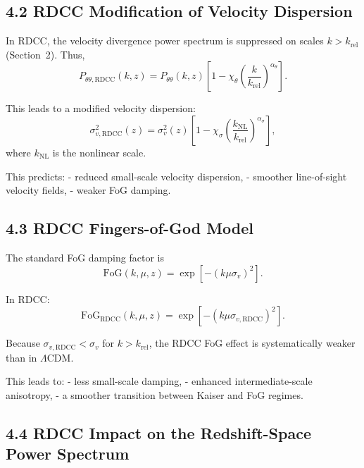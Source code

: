 \documentclass[11pt,a4paper]{article}
\begin{document}
\subsection{4.2 RDCC Modification of Velocity Dispersion}

In RDCC, the velocity divergence power spectrum is suppressed on scales
$k > k_{\mathrm{rel}}$ (Section~2). Thus,
\begin{equation}
P_{\theta\theta,\mathrm{RDCC}}(k,z)
=
P_{\theta\theta}(k,z)
\left[
1
-
\chi_{\theta}
\left(
\frac{k}{k_{\mathrm{rel}}}
\right)^{\alpha_{\theta}}
\right].
\end{equation}

This leads to a modified velocity dispersion:
\begin{equation}
\sigma_{v,\mathrm{RDCC}}^{2}(z)
=
\sigma_{v}^{2}(z)
\left[
1
-
\chi_{\sigma}
\left(
\frac{k_{\mathrm{NL}}}{k_{\mathrm{rel}}}
\right)^{\alpha_{\sigma}}
\right],
\end{equation}
where $k_{\mathrm{NL}}$ is the nonlinear scale.

This predicts:
- reduced small-scale velocity dispersion,  
- smoother line-of-sight velocity fields,  
- weaker FoG damping.

\subsection{4.3 RDCC Fingers-of-God Model}

The standard FoG damping factor is
\begin{equation}
\mathrm{FoG}(k,\mu,z)
=
\exp\!\left[
- (k\mu\sigma_{v})^{2}
\right].
\end{equation}

In RDCC:
\begin{equation}
\mathrm{FoG}_{\mathrm{RDCC}}(k,\mu,z)
=
\exp\!\left[
- (k\mu\sigma_{v,\mathrm{RDCC}})^{2}
\right].
\end{equation}

Because $\sigma_{v,\mathrm{RDCC}} < \sigma_{v}$ for $k > k_{\mathrm{rel}}$, the RDCC FoG effect is
systematically weaker than in $\Lambda$CDM.

This leads to:
- less small-scale damping,  
- enhanced intermediate-scale anisotropy,  
- a smoother transition between Kaiser and FoG regimes.

\subsection{4.4 RDCC Impact on the Redshift-Space Power Spectrum}
\end{document}
